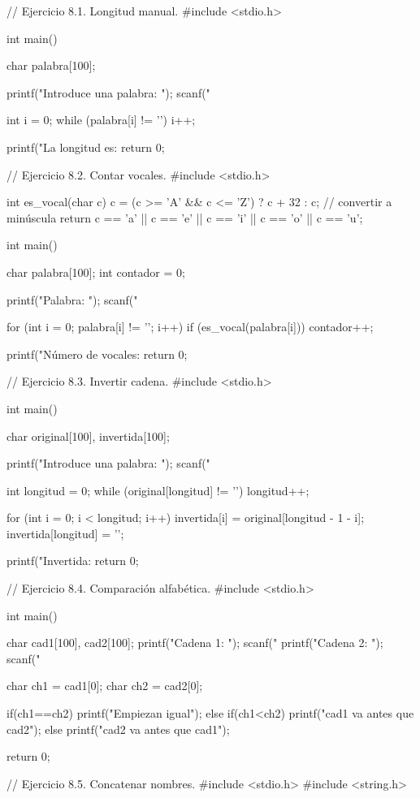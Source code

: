 // Ejercicio 8.1. Longitud manual.
#include <stdio.h>

int main() {
   char palabra[100];
   
   printf("Introduce una palabra: ");
   scanf("%
   
   int i = 0;
   while (palabra[i] != '\0') {
      i++;
   }
   
   printf("La longitud es: %
   return 0;
}   


// Ejercicio 8.2. Contar vocales.
#include <stdio.h>

int es_vocal(char c) {
   c = (c >= 'A' && c <= 'Z') ? c + 32 : c; // convertir a minúscula
   return c == 'a' || c == 'e' || c == 'i' || c == 'o' || c == 'u';
}

int main() {
   char palabra[100];
   int contador = 0;
   
   printf("Palabra: ");
   scanf("%
   
   for (int i = 0; palabra[i] != '\0'; i++) {
      if (es_vocal(palabra[i])) {
         contador++;
      }
   }
   
   printf("Número de vocales: %
   return 0;
}   


// Ejercicio 8.3. Invertir cadena.
#include <stdio.h>

int main() {
   char original[100], invertida[100];
   
   printf("Introduce una palabra: ");
   scanf("%
   
   int longitud = 0;
   while (original[longitud] != '\0') {
      longitud++;
   }
   
   for (int i = 0; i < longitud; i++) {
      invertida[i] = original[longitud - 1 - i];
   }
   invertida[longitud] = '\0';
   
   printf("Invertida: %
   return 0;
} 


// Ejercicio 8.4. Comparación alfabética.
#include <stdio.h>

int main() {
   char cad1[100], cad2[100];
   printf("Cadena 1: ");
   scanf("%
   printf("Cadena 2: ");
   scanf("%
   
   char ch1 = cad1[0];
   char ch2 = cad2[0];
   
   if(ch1==ch2) {
      printf("Empiezan igual\n");
   } else if(ch1<ch2) {
      printf("cad1 va antes que cad2\n");
   } else {
      printf("cad2 va antes que cad1\n");
   }
   
   return 0;
} 

// Ejercicio 8.5.  Concatenar nombres.
#include <stdio.h>
#include <string.h>

